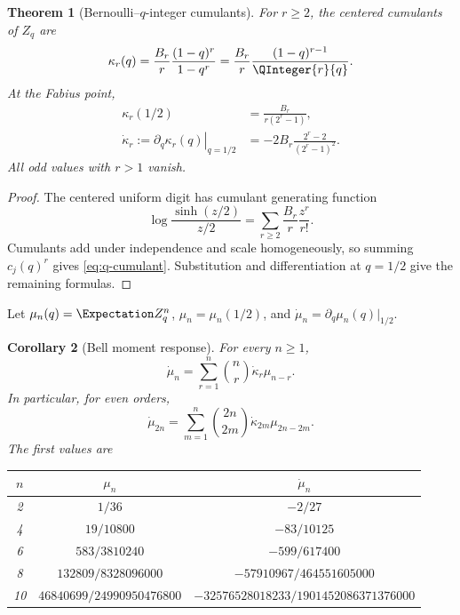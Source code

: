 \documentclass[11pt,oneside]{article}
\newtheorem{theorem}{Theorem}[section]
\newtheorem{corollary}[theorem]{Corollary}
\theoremstyle{definition}
\theoremstyle{remark}
\begin{document}
\begin{theorem}[Bernoulli--\(q\)-integer cumulants]
\label{thm:cumulants}
For \(r\ge2\), the centered cumulants of \(Z_q\) are
\begin{equation}
 \kappa_r(q)
 =\frac{B_r}{r}\frac{(1-q)^r}{1-q^r}
 =\frac{B_r}{r}\frac{(1-q)^{r-1}}{\QInteger{r}{q}}.
 \label{eq:q-cumulant}
\end{equation}
At the Fabius point,
\begin{align}
 \kappa_r(1/2)&=\frac{B_r}{r(2^r-1)},
 \label{eq:half-cumulant}\\
 \dot\kappa_r
 :=\left.\partial_q\kappa_r(q)\right|_{q=1/2}
 &=-2B_r\frac{2^r-2}{(2^r-1)^2}.
 \label{eq:half-cumulant-derivative}
\end{align}
All odd values with \(r>1\) vanish.
\end{theorem}

\begin{proof}
The centered uniform digit has cumulant generating function
\[
 \log\frac{\sinh(z/2)}{z/2}
 =\sum_{r\ge2}\frac{B_r}{r}\frac{z^r}{r!}.
\]
Cumulants add under independence and scale homogeneously, so summing
\(c_j(q)^r\) gives \eqref{eq:q-cumulant}.  Substitution and differentiation at \(q=1/2\)
give the remaining formulas.
\end{proof}

Let \(\mu_n(q)=\Expectation Z_q^n\), \(\mu_n=\mu_n(1/2)\), and
\(\dot\mu_n=\partial_q\mu_n(q)|_{1/2}\).

\begin{corollary}[Bell moment response]
\label{cor:moment-response}
For every \(n\ge1\),
\begin{equation}
 \boxed{\displaystyle
 \dot\mu_n=\sum_{r=1}^{n}\binom nr\dot\kappa_r\mu_{n-r}.}
 \label{eq:moment-response}
\end{equation}
In particular, for even orders,
\begin{equation}
 \dot\mu_{2n}=\sum_{m=1}^{n}\binom{2n}{2m}
 \dot\kappa_{2m}\mu_{2n-2m}.
 \label{eq:even-moment-response}
\end{equation}
The first values are
\begin{center}
\begin{tabular}{@{}c c c@{}}
\toprule
\(n\) & \(\mu_n\) & \(\dot\mu_n\)\\
\midrule
2 & \(1/36\) & \(-2/27\)\\
4 & \(19/10800\) & \(-83/10125\)\\
6 & \(583/3810240\) & \(-599/617400\)\\
8 & \(132809/8328096000\) & \(-57910967/464551605000\)\\
10 & \(46840699/24990950476800\) & \(-32576528018233/1901452086371376000\)\\
\bottomrule
\end{tabular}
\end{center}
\end{corollary}
\end{document}
